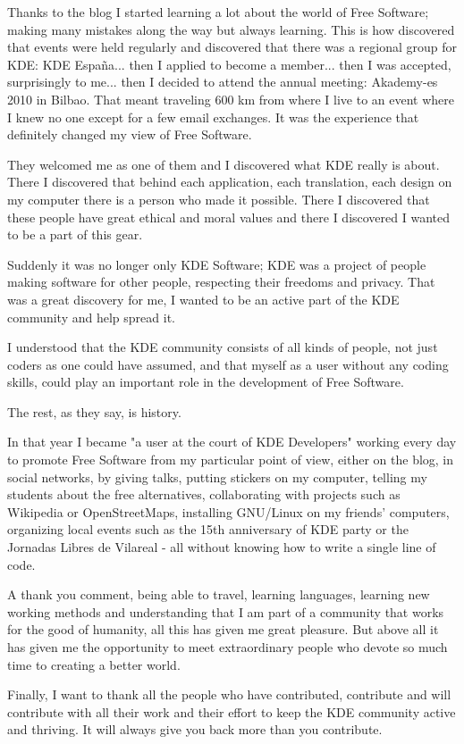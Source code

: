Thanks to the blog I started learning a lot about the world of Free Software; making many mistakes along the way but always learning.
This is how discovered that events were held regularly and discovered that there was a regional group for KDE: KDE Espa\~na... then I applied to become a member... then I was accepted, surprisingly to me... then I decided to attend the annual meeting: Akademy-es 2010 in Bilbao. That meant traveling 600 km from where I live to an event where I knew no one except for a few email exchanges. It was the experience that definitely changed my view of Free Software.

They welcomed me as one of them and I discovered what KDE really is about. There I discovered that behind each application, each translation, each design on my computer there is a person who made it possible. There I discovered that these people have great ethical and moral values and there I discovered I wanted to be a part of this gear.

Suddenly it was no longer only KDE Software; KDE was a project of people making software for other people, respecting their freedoms and privacy. That was a great discovery for me, I wanted to be an active part of the KDE community and help spread it.

I understood that the KDE community consists of all kinds of people, not just coders as one could have assumed, and that myself as a user without any coding skills, could play an important role in the development of Free Software.

The rest, as they say, is history.

In that year I became "a user at the court of KDE Developers" working every day to promote Free Software from my particular point of view, either on the blog, in social networks, by giving talks, putting stickers on my computer, telling my students about the free alternatives, collaborating with projects such as Wikipedia or OpenStreetMaps, installing GNU/Linux on my friends' computers, organizing local events such as the 15th anniversary of KDE party or the Jornadas Libres de Vilareal - all without knowing how to write a single line of code.

A thank you comment, being able to travel, learning languages, learning new working methods and understanding that I am part of a community that works for the good of humanity, all this has given me great pleasure. But above all it has given me the opportunity to meet extraordinary people who devote so much time to creating a better world.

Finally, I want to thank all the people who have contributed, contribute and will contribute with all their work and their effort to keep the KDE community active and thriving. It will always give you back more than you contribute.
